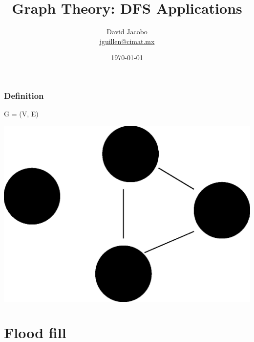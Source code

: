 \documentclass[article]{beamer}
\title{Graph Theory: DFS Applications}
\author{David Jacobo \\ \href{mailto:jguillen@cimat.mx}{jguillen@cimat.mx}}
\date{\scriptsize{\today}}
\begin{document}
\maketitle			
			
\begin{frame}
\frametitle{Definition}
\begin{center}
\huge
	G = (V, E)
	
\vspace{8mm}	
	
\includegraphics[scale=0.3]{./figures/graph.eps}
\end{center}
\end{frame}


\section{Flood fill}
\end{document}
